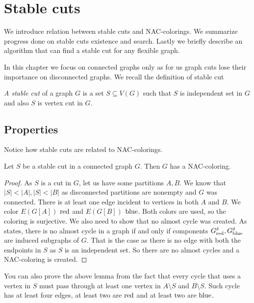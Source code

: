 
\chapter{Stable cuts}%
\label{chapter:stable_cuts}

\begin{chapterabstract}
	We introduce relation between stable cuts and NAC-colorings.
	We summarize progress done on stable cuts existence and search.
	Lastly we briefly describe an algorithm that can find a stable cut
	for any flexible graph.
\end{chapterabstract}

In this chapter we focus on connected graphs only as for us graph cuts
lose their importance on disconnected graphs.
We recall the definition of stable cut
%
\begin{definition}
	\emph{A stable cut} of a graph \( G \) is a set \( S \subseteq V(G) \) such that
	\( S \) is independent set in \( G \) and also \( S \) is vertex cut in \( G \).
\end{definition}
%

\section{Properties}

Notice how stable cuts are related to NAC-colorings.
%
\begin{lemma}
	Let \( S \) be a stable cut in a connected graph \( G \).
	Then \( G \) has a NAC-coloring.
\end{lemma}
%
\begin{proof}
	As \( S \) is a cut in \( G \), let us have some partitions \( A, B \).
	We know that \( |S| < |A|, |S| < |B| \)
	as disconnected partitions are nonempty and \( G \) was connected.
	There is at least one edge incident to vertices in both \( A \) and \( B \).
	We color \( E(G[A]) \) \( \text{red} \) and \( E(G[B]) \) \( \text{blue} \).
	Both colors are used, so the coloring is surjective.
	We also need to show that no almost cycle was created.
	As~
	states, there is no almost cycle in a graph if and only
	if components \( G_{\text{red}}^\delta, G_{\text{blue}}^\delta \)
	are induced subgraphs of \( G \).
	That is the case as there is no edge with both the endpoints in \( S \)
	as \( S \) is an independent set.
	So there are no almost cycles and a NAC-coloring is created.
\end{proof}
%
You can also prove the above lemma from the fact that every cycle that
uses a vertex in \( S \) must pass
through at least one vertex in \( A \setminus S \) and \( B \setminus S \).
Such cycle has at least four edges,
at least two are \( \text{red} \) and at least two are \( \text{blue} \).

